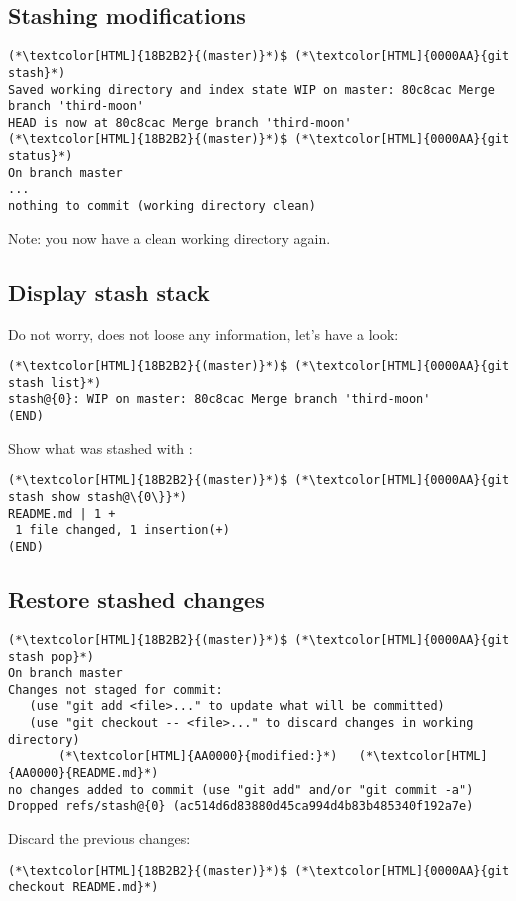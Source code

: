 \subsection{Stashing modifications}
\begin{frame}[fragile]
  \subslidetitle

  \begin{lstlisting}
(*\textcolor[HTML]{18B2B2}{(master)}*)$ (*\textcolor[HTML]{0000AA}{git stash}*)
Saved working directory and index state WIP on master: 80c8cac Merge branch 'third-moon'
HEAD is now at 80c8cac Merge branch 'third-moon'
(*\textcolor[HTML]{18B2B2}{(master)}*)$ (*\textcolor[HTML]{0000AA}{git status}*)
On branch master
...
nothing to commit (working directory clean)
\end{lstlisting}
  Note: you now have a clean working directory again.
\end{frame}

\subsection{Display stash stack}
\begin{frame}[fragile]
  \subslidetitle
  Do not worry,  does not loose any information, let's have a look:

  \begin{lstlisting}
(*\textcolor[HTML]{18B2B2}{(master)}*)$ (*\textcolor[HTML]{0000AA}{git stash list}*)
stash@{0}: WIP on master: 80c8cac Merge branch 'third-moon'
(END)
\end{lstlisting}
  Show what was stashed with :
  \begin{lstlisting}
(*\textcolor[HTML]{18B2B2}{(master)}*)$ (*\textcolor[HTML]{0000AA}{git stash show stash@\{0\}}*)
README.md | 1 +
 1 file changed, 1 insertion(+)
(END)
\end{lstlisting}

\end{frame}

\subsection{Restore stashed changes}
\begin{frame}[fragile]
  \subslidetitle

  \begin{lstlisting}
(*\textcolor[HTML]{18B2B2}{(master)}*)$ (*\textcolor[HTML]{0000AA}{git stash pop}*)
On branch master
Changes not staged for commit:
   (use "git add <file>..." to update what will be committed)
   (use "git checkout -- <file>..." to discard changes in working directory)
       (*\textcolor[HTML]{AA0000}{modified:}*)   (*\textcolor[HTML]{AA0000}{README.md}*)
no changes added to commit (use "git add" and/or "git commit -a")
Dropped refs/stash@{0} (ac514d6d83880d45ca994d4b83b485340f192a7e)
\end{lstlisting}
  Discard the previous changes:
  \begin{lstlisting}
(*\textcolor[HTML]{18B2B2}{(master)}*)$ (*\textcolor[HTML]{0000AA}{git checkout README.md}*)
\end{lstlisting}
\end{frame}

